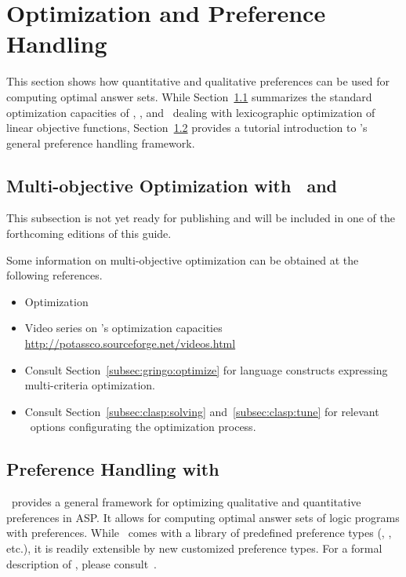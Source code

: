 
\section{Optimization and Preference Handling}
\label{sec:prefopt}

This section shows how quantitative and qualitative preferences can be used for computing optimal answer sets.
While Section~\ref{sec:optimization} summarizes the standard optimization capacities of \clasp, \gringo, and \clingo\
dealing with lexicographic optimization of linear objective functions,
Section~\ref{sec:asprin} provides a tutorial introduction to \asprin's general preference handling framework.

\subsection{Multi-objective Optimization with \clasp\ and \clingo}
\label{sec:optimization}

This subsection is not yet ready for publishing
and will be included in one of the forthcoming editions of this guide.

Some information on multi-objective optimization
can be obtained at the following references.

\begin{itemize}
\item Optimization \cite{gekakasc11b,gekakasc11c,gekasc11b,ankamasc12a}
\item Video series on \clasp's optimization capacities \url{http://potassco.sourceforge.net/videos.html}
\item Consult Section~\ref{subsec:gringo:optimize} for language constructs expressing multi-criteria optimization.
\item Consult Section~\ref{subsec:clasp:solving} and~\ref{subsec:clasp:tune} for relevant \clasp\ options configurating the optimization process.
\end{itemize}

\subsection{Preference Handling with \asprin}\label{sec:asprin}
\asprin\ provides a general framework for optimizing qualitative and quantitative preferences in ASP.
It allows for computing optimal answer sets of logic programs with preferences.
While \asprin\ comes with a library of predefined preference types 
(\code{subset}, \code{pareto}, etc.),
it is readily extensible by new customized preference types.
For a formal description of \asprin, please consult~\cite{brderosc15a}. 

